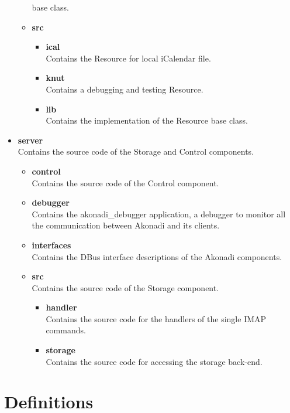\documentclass[]{report}
\begin{document}
\begin{itemize}
\begin{itemize}
      base class.
    \item \textbf{src}\\
    \begin{itemize}
      \item \textbf{ical}\\
        Contains the Resource for local iCalendar file.
      \item \textbf{knut}\\
        Contains a debugging and testing Resource.
      \item \textbf{lib}\\
        Contains the implementation of the Resource base class.
    \end{itemize}
  \end{itemize}
  \item \textbf{server}\\
    Contains the source code of the Storage and Control components.
  \begin{itemize}
    \item \textbf{control}\\
      Contains the source code of the Control component.
    \item \textbf{debugger}\\
      Contains the akonadi\_debugger application, a debugger to monitor all the communication
      between Akonadi and its clients.
    \item \textbf{interfaces}\\
      Contains the DBus interface descriptions of the Akonadi components.
    \item \textbf{src}\\
      Contains the source code of the Storage component.
    \begin{itemize}
      \item \textbf{handler}\\
        Contains the source code for the handlers of the single IMAP commands.
      \item \textbf{storage}\\
        Contains the source code for accessing the storage back-end.
    \end{itemize}
  \end{itemize}
\end{itemize}

\section{Definitions}
\end{document}
